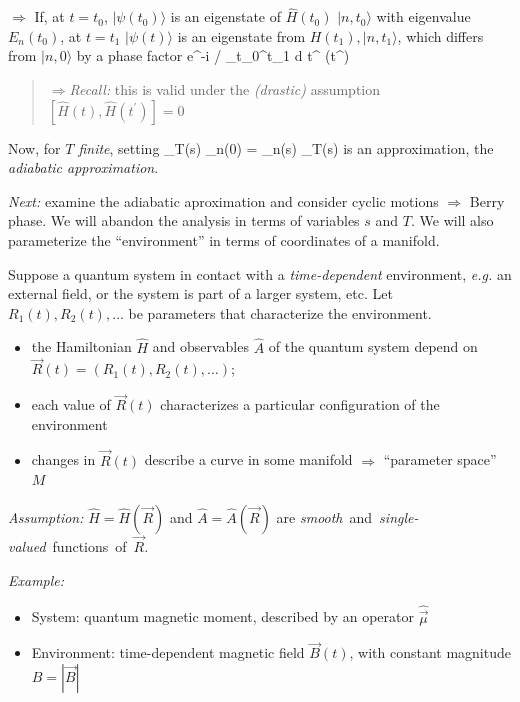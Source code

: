 \documentclass[12pt]{article}
\begin{document}
\ee
$\Rightarrow$ 
If, at $t=t_{0}$, $|\psi(t_{0})\rangle$ is an eigenstate of $\hat{H}(t_{0})$
$|n, t_{0}\rangle$ with eigenvalue $E_{n}(t_{0})$, at $t=t_{1}$ $|\psi(t)\rangle$
is an eigenstate from $H(t_{1}),|n, t_{1}\rangle$, which differs
from $|n, 0\rangle$ by a phase factor
%
\be
e^{-i / \hbar \int_{t_{0}}^{t_{1}} d t^{\prime} \left(t^{\prime}\right)}
\ee
%
\begin{quote}
$\Rightarrow$\emph{Recall:} this is valid under the 
\emph{(drastic)} assumption
$[\hat{H}(t), \hat{H}(t^{\prime})]=0$
\end{quote}

\setcounter{equation}{65}
Now, for \emph{$T$ finite}, setting
\be
{}_T(s) _n(0) = _n(s) _T(s)
\ee
is an approximation, the \emph{adiabatic approximation}.

\emph{Next:} examine the adiabatic aproximation
and consider cyclic motions $\Rightarrow$ Berry phase.
We will abandon the analysis in terms of
variables $s$ and $T$. We will also parameterize
the ``environment'' in terms of coordinates
of a manifold.


Suppose a quantum system in contact with a \emph{time-dependent}
environment, \textit{e.g.} an external field, or the system
is part of a larger system, etc. Let $R_{1}(t), R_{2}(t), \ldots$
be parameters that characterize the environment.
\begin{itemize}
\item the Hamiltonian $\hat{H}$ and observables $\hat{A}$ of the quantum
system depend on $\vec{R}(t)=\left(R_{1}(t), R_{2}(t), \ldots\right)$;
\item each value of $\vec{R}(t)$ characterizes a particular
configuration of the environment
\item changes in $\vec{R}(t)$ describe a curve
in some manifold $\Rightarrow$ ``parameter space'' $M$
\end{itemize}

\emph{Assumption:} $\hat{H}=\hat{H}(\vec{R})$ and $\hat{A}=\hat{A}(\vec{R})$ are \mbox{\emph{smooth} and \emph{single-valued} functions of $\vec{R}$}.


\emph{Example:}
\begin{itemize}
\item System: quantum magnetic moment,
 described by an operator $\hat{\vec{\mu}}$
\item Environment: time-dependent magnetic field
$\vec{B}(t)$, with constant magnitude $B=|\vec{B}|$
\end{itemize}
\end{document}

